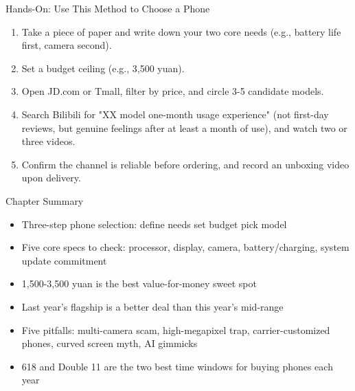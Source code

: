 \begin{tcbpractice}{Hands-On: Use This Method to Choose a Phone}
\begin{enumerate}
  \item Take a piece of paper and write down your two core needs (e.g., battery life first, camera second).
  \item Set a budget ceiling (e.g., 3,500 yuan).
  \item Open JD.com or Tmall, filter by price, and circle 3-5 candidate models.
  \item Search Bilibili for "XX model one-month usage experience" (not first-day reviews, but genuine feelings after at least a month of use), and watch two or three videos.
  \item Confirm the channel is reliable before ordering, and record an unboxing video upon delivery.
\end{enumerate}

\end{tcbpractice}

\begin{tcbsummary}{Chapter Summary}
\begin{itemize}
  \item Three-step phone selection: define needs set budget pick model
  \item Five core specs to check: processor, display, camera, battery/charging, system update commitment
  \item 1,500-3,500 yuan is the best value-for-money sweet spot
  \item Last year's flagship is a better deal than this year's mid-range
  \item Five pitfalls: multi-camera scam, high-megapixel trap, carrier-customized phones, curved screen myth, AI gimmicks
  \item 618 and Double 11 are the two best time windows for buying phones each year
\end{itemize}

\end{tcbsummary}
